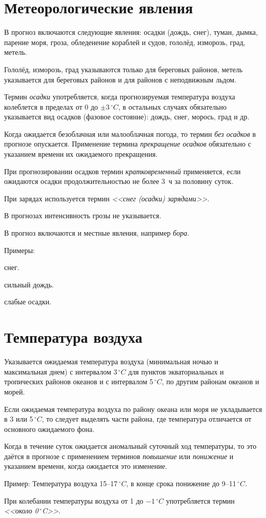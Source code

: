 \documentclass[a4paper, 12pt, twoside, draft, book, russian, fittopage, cyremdash, openright]{ncc}
\newcommand{\gr}{\ensuremath{\,^\circ}\xspace}
\newcommand{\grC}{\ensuremath{\,^\circ{}C}\xspace}
\begin{document}
\section{Метеорологические явления}
\label{sec:meteo_phenom}

В прогноз включаются следующие явления: осадки (дождь, снег), туман,
дымка, парение моря, гроза, обледенение кораблей и судов, гололёд,
изморозь, град, метель.

Гололёд, изморозь, град указываются только для береговых районов,
метель указывается для береговых районов и для районов с неподвижным
льдом.

Термин \textit{осадки} употребляется, когда прогнозируемая температура
воздуха колеблется в пределах от 0 до $\pm3\grC$, в остальных случаях
обязательно указывается вид осадков (фазовое состояние): дождь, снег,
морось, град и др.

Когда ожидается безоблачная или малооблачная погода, то термин
\textit{без осадков} в прогнозе опускается. Применение термина
\textit{прекращение осадков} обязательно с указанием времени их
ожидаемого прекращения.

При прогнозировании осадков термин \textit{кратковременный}
применяется, если ожидаются осадки продолжительностью не более 3~ч за
половину суток.

При зарядах используется термин \textit{<<снег (осадки) зарядами>>}.

В прогнозах интенсивность грозы не указывается.

В прогноз включаются и местные явления, например \textit{бора}.

Примеры:
\begin{list}{}{}
\item {} снег.
\item {} сильный дождь.
\item {} слабые осадки.
\end{list}

\section{Температура воздуха}
\label{sec:temp}

Указывается ожидаемая температура воздуха (минимальная ночью и
максимальная днем) с интервалом 3\grC для пунктов экваториальных и
тропических районов океанов и с интервалом 5\grC, по другим районам
океанов и морей.

Если ожидаемая температура воздуха по району океана или моря не
укладывается в 3 или 5\grC, то следует выделять части района, где
температура отличается от основного ожидаемого фона.

Когда в течение суток ожидается аномальный суточный ход температуры,
то это даётся в прогнозе с применением терминов \textit{повышение} или
\textit{понижение} и указанием времени, когда ожидается это изменение.

Пример: Температура воздуха 15--17\grC, в конце срока понижение до
9--11\grC.

При колебании температуры воздуха от 1 до $-1\grC$ употребляется
термин \textit{<<около 0\gr{}C>>}.

\backmatter{}

\printindex
\end{document}
